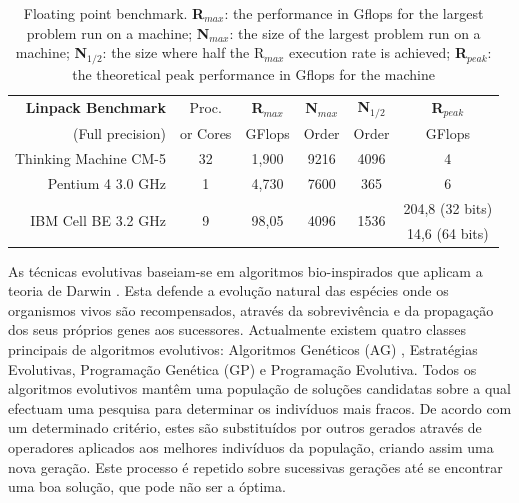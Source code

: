 
\begin{table}
  \caption[exemplo de uma tabela]{Floating point benchmark.
	\textbf{R$_{max}$}: the performance in Gflops for the largest problem run on a machine;
	\textbf{N$_{max}$}: the size of the largest problem run on a machine;
	\textbf{N$_{1/2}$}: the size where half the R$_{max}$ execution rate is achieved;
	\textbf{R$_{peak}$}: the theoretical peak performance in Gflops for the machine}
  \label{tableBenchmark}
  \begin{center} 
  \begin{tabular*}{1\textwidth}{@{\extracolsep{\fill}} rccccc } \toprule
\textbf{Linpack	Benchmark}& Proc.	& \textbf{R$_{max}$} & \textbf{N$_{max}$} & \textbf{N$_{1/2}$}	& \textbf{R$_{peak}$} \\ 
(Full precision)	& or Cores	& GFlops	     & Order		  & Order		& GFlops \\ [0.25ex] \midrule
Thinking Machine CM-5	& 32		& 1,900		     & 9216		  & 4096		& 4 \\
Pentium 4 3.0 GHz & 1	& 4,730		     & 7600		  & 365			& 6 \\
\multirow{2}{*}{IBM Cell BE 3.2 GHz} 	& \multirow{2}{*}{9}& \multirow{2}{*}{98,05} & \multirow{2}{*}{4096} & \multirow{2}{*}{1536} & 204,8 {\scriptsize{(32 bits)}} \\
			&		&		     &			  &			& 14,6 {\scriptsize{(64 bits)}} \\ \bottomrule
  \end{tabular*}
  \end{center}	
\end{table}



As técnicas evolutivas baseiam-se em algoritmos bio-inspirados que aplicam a teoria de Darwin \parencite{Darwin1859}. Esta defende a evolução natural das espécies onde os organismos vivos são recompensados, através da sobrevivência e da propagação dos seus próprios genes aos sucessores. Actualmente existem quatro classes principais de algoritmos evolutivos: Algoritmos Genéticos (AG) \parencite{Holland1975}, Estratégias Evolutivas, Programação Genética (GP) \parencite{Koza1992} e Programação Evolutiva. Todos os algoritmos evolutivos mantêm uma população de soluções candidatas sobre a qual efectuam uma pesquisa para determinar os indivíduos mais fracos. De acordo com um determinado critério, estes são substituídos por outros gerados através de operadores aplicados aos melhores indivíduos da população, criando assim uma nova geração. Este processo é repetido sobre sucessivas gerações até se encontrar uma boa solução, que pode não ser a óptima.

